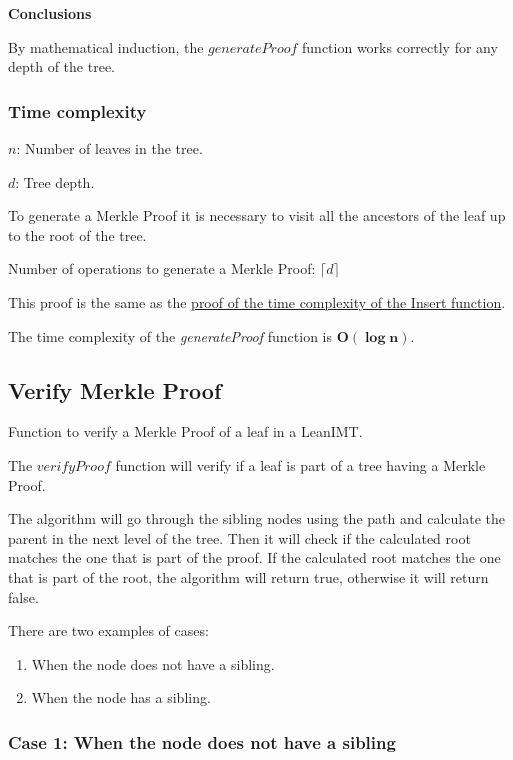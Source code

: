 \documentclass{article}
\begin{document}
\textbf{Conclusions}

By mathematical induction, the $generateProof$ function works correctly for any depth of the tree.


\subsubsection{Time complexity}



$n$: Number of leaves in the tree.

$d$: Tree depth.



To generate a Merkle Proof it is necessary to visit all the ancestors of the leaf up to the root of the tree.



Number of operations to generate a Merkle Proof: $\lceil d \rceil$

This proof is the same as the \hyperref[InsertProof]{proof of the time complexity of the Insert function}.

The time complexity of the \textit{generateProof} function is $\boldsymbol{O(\log n)}$.



\subsection{Verify Merkle Proof}

Function to verify a Merkle Proof of a leaf in a LeanIMT.

The $verifyProof$ function will verify if a leaf is part of a tree having a Merkle Proof.

The algorithm will go through the sibling nodes using the path and calculate the parent in the next level of the tree. Then it will check if the calculated root matches the one that is part of the proof.
If the calculated root matches the one that is part of the root, the algorithm will return true, otherwise it will return false.

There are two examples of cases:

\begin{enumerate}
    \item When the node does not have a sibling.
    \item When the node has a sibling.
\end{enumerate}

\subsubsection*{Case 1: When the node does not have a sibling}
\end{document}
